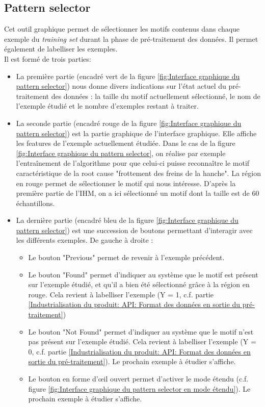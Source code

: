 \subsection{Pattern selector}
\label{Industrialisation du produit: Outils graphiques: Pattern selection}
Cet outil graphique permet de sélectionner les motifs contenus dans chaque exemple du \emph{training set} durant la phase de pré-traitement des données.  Il permet également  de labelliser les exemples. \\
Il est formé de trois parties:
\begin{itemize}
	\item La première partie (encadré vert de la figure \ref{fig:Interface graphique du pattern selector}) nous donne divers indications sur l'état actuel du pré-traitement des données : la taille du motif actuellement sélectionné, le nom de l'exemple étudié et le nombre d'exemples restant à traiter. 
	\item La seconde partie (encadré rouge de la figure  \ref{fig:Interface graphique du pattern selector}) est la partie graphique de l'interface graphique. Elle affiche les features de l'exemple actuellement étudiée. Dans le cas de la figure  \ref{fig:Interface graphique du pattern selector}, on réalise par exemple l'entraînement de l'algorithme pour que celui-ci puisse reconnaître le motif caractéristique de la root cause "frottement des freins de la hanche". La région en rouge permet de sélectionner le motif qui nous intéresse. D'après la première partie de l'IHM, on a ici sélectionné un motif dont la taille est de 60 échantillons.
	\item La dernière partie (encadré bleu de la figure  \ref{fig:Interface graphique du pattern selector}) est une succession de boutons permettant d'interagir avec les différents exemples. De gauche à droite :   
	\begin{itemize}
		\item Le  bouton "Previous" permet de revenir à l'exemple précédent.
		\item Le bouton "Found" permet d'indiquer au système que le motif est présent sur l'exemple étudié, et qu'il a bien été sélectionné grâce à la région en rouge. Cela revient à labelliser l'exemple (Y = 1, c.f. partie \ref{Industrialisation du produit: API: Format des données en sortie du pré-traitement})
		\item Le bouton "Not Found" permet d'indiquer au système que le motif n'est pas présent sur l'exemple étudié. Cela revient à labelliser l'exemple (Y = 0, c.f. partie \ref{Industrialisation du produit: API: Format des données en sortie du pré-traitement}). Le prochain exemple à étudier s'affiche.
		\item Le bouton en forme d'œil ouvert permet d'activer le mode étendu (c.f. figure \ref{fig:Interface graphique du pattern selector en mode étendu}). Le prochain exemple à étudier s'affiche.
	\end{itemize} 
\end{itemize} 


